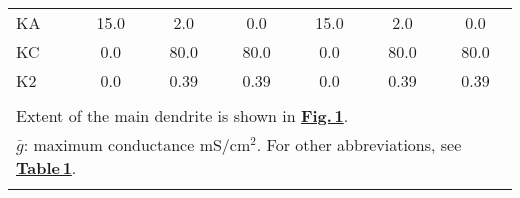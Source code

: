 \documentclass[12pt]{article}
\begin{document}
\begin{table}[!h]
\begin{tabular}{ l c c c c c c }
KA              &15.0             & 2.0                                     & 0.0                              & 15.0             & 2.0                      & 0.0                                                  \\
KC              & 0.0              & 80.0                                   & 80.0                            & 0.0               & 80.0                    & 80.0                                                \\
K2              & 0.0              & 0.39                                    & 0.39                            & 0.0               & 0.39                   & 0.39                                                \\
                   &                     &                                            &                                      &                     &                             &                                                         \\
\multicolumn{7}{l}{Extent of the main dendrite is shown in \href{../pub-purkinje-deschutter-fig-1/pub-purkinje-deschutter-fig-1.tex}{\bf Fig.\,1}.}                                                                                                                                 \\
\multicolumn{7}{l}{$\bar g$: maximum conductance mS/cm$^2$. For other abbreviations, see \href{../pub-purkinje-deschutter1-table1/pub-purkinje-deschutter1-table1.tex}{\bf Table\,1}.}                                                \\
\multicolumn{7}{l}{}                                                                                                                                                                                                                   \\
\end{tabular}
\end{table}



\end{document}
